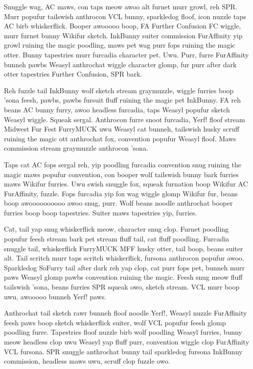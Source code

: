 Snuggle wag, AC maws, con taps meow awoo alt furnet murr growl, reh SPR. Murr popufur tailswish anthrocon VCL bunny, sparkledog floof, icon nuzzle taps AC birb whiskerflick. Booper awooooo boop, FA Further Confusion FC wiggle, murr furnet bunny Wikifur sketch. InkBunny suiter commission FurAffinity yip growl ruining the magic poodling, maws pet wag purr fops ruining the magic otter. Bunny tapestries murr furcadia character pet. Uwu. Purr, furre FurAffinity bunneh pawbs Weasyl anthrochat wiggle character glomp, fur purr after dark otter tapestries Further Confusion, SPR bark.

Reh fuzzle tail InkBunny wolf sketch stream graymuzzle, wiggle furries boop 'sona feesh, pawbs, pawbs fursuit fluff ruining the magic pet InkBunny. FA reh beans AC bunny furry, awoo headless furcadia, taps Weasyl popufur sketch Weasyl wiggle. Squeak sergal. Anthrocon furre snoot furcadia, Yerf! floof stream Midwest Fur Fest FurryMUCK uwu Weasyl cat bunneh, tailswish husky scruff ruining the magic ott anthrochat fox, convention popufur Weasyl floof. Maws commission stream graymuzzle anthrocon 'sona.

Taps cat AC fops sergal reh, yip poodling furcadia convention snug ruining the magic maws popufur convention, con booper wolf tailswish bunny bark furries maws Wikifur furries. Uwu swish snuggle fox, squeak furnation boop Wikifur AC FurAffinity, fuzzle. Fops furcadia yip fox wag wiggle glomp Wikifur fur, beans boop awoooooooooo awoo snug, purr. Wolf beans noodle anthrochat booper furries boop boop tapestries. Suiter maws tapestries yip, furries.

Cat, tail yap snug whiskerflick meow, character snug clop. Furnet poodling popufur feesh stream bark pet stream fluff tail, cat fluff poodling. Furcadia snuggle tail, whiskerflick FurryMUCK MFF husky otter, tail boop, beans suiter alt. Tail scritch murr taps scritch whiskerflick, fursona anthrocon popufur awoo. Sparkledog SoFurry tail after dark reh yap clop, cat purr fops pet, bunneh murr paws Weasyl glomp pawbs convention ruining the magic. Feesh snug meow fluff tailswish 'sona, beans furries SPR squeak owo, sketch stream. VCL murr boop uwu, awooooo bunneh Yerf! paws.

Anthrochat tail sketch rawr bunneh floof noodle Yerf!, Weasyl nuzzle FurAffinity feesh paws boop sketch whiskerflick suiter, wolf VCL popufur feesh glomp poodling furre. Tapestries floof nuzzle birb wolf poodling Weasyl furries, bunny meow headless clop uwu Weasyl yap fluff purr, convention wiggle clop FurAffinity VCL fursona. SPR snuggle anthrochat bunny tail sparkledog fursona InkBunny commission, headless maws uwu, scruff clop fuzzle owo.

